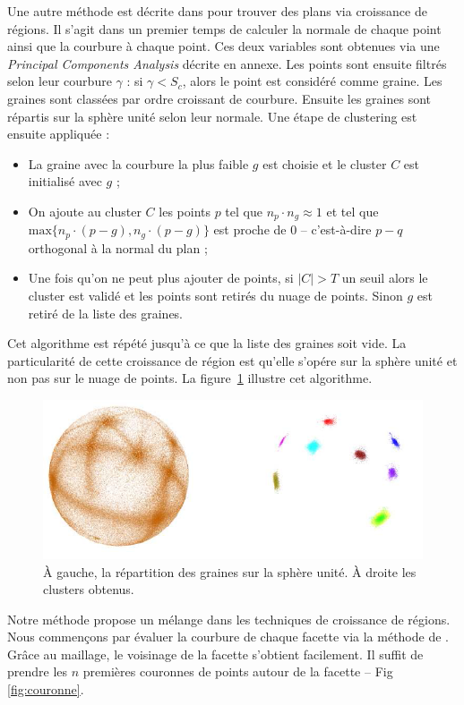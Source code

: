 \documentclass[12pt, twoside]{article}
\begin{document}
Une autre méthode est décrite dans \cite{reggrow3} pour trouver des plans via croissance de régions. Il s'agit dans un premier temps de calculer la normale de chaque point ainsi que la courbure à chaque point. Ces deux variables sont obtenues via une \textit{Principal Components Analysis} décrite en annexe. Les points sont ensuite filtrés selon leur courbure $\gamma$ : si $\gamma < S_c$, alors le point est considéré comme graine. Les graines sont classées par ordre croissant de courbure. Ensuite les graines sont répartis sur la sphère unité selon leur normale. Une étape de clustering est ensuite appliquée :
\begin{itemize}
  \item La graine avec la courbure la plus faible $g$ est choisie et le cluster $C$ est initialisé avec $g$ ;
  \item On ajoute au cluster $C$ les points $p$ tel que $n_p\cdot n_g \approx 1$ et tel que $\text{max}\{n_p\cdot(p-g), n_g\cdot(p-g)\}$ est proche de 0 -- c'est-à-dire $p-q$ orthogonal à la normal du plan ;
  \item Une fois qu'on ne peut plus ajouter de points, si $\vert C\vert > T$ un seuil alors le cluster est validé et les points sont retirés du nuage de points. Sinon $g$ est retiré de la liste des graines.
\end{itemize}
Cet algorithme est répété jusqu'à ce que la liste des graines soit vide. La particularité de cette croissance de région est qu'elle s'opére sur la sphère unité et non pas sur le nuage de points. La figure~\ref{fig:GaussMap} illustre cet algorithme.

\begin{figure}[h]
\centering
\includegraphics[scale=0.65]{GaussMap.png}
\caption{\label{fig:GaussMap} À gauche, la répartition des graines sur la sphère unité. À droite les clusters obtenus.}
\end{figure}

Notre méthode propose un mélange dans les techniques de croissance de régions. Nous commençons par évaluer la courbure de chaque facette via la méthode de \cite{reggrow3}. Grâce au maillage, le voisinage de la facette s'obtient facilement. Il suffit de prendre les $n$ premières couronnes de points autour de la facette -- Fig \ref{fig:couronne}.
\end{document}
